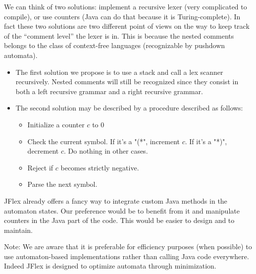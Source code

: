 \documentclass[12pt]{report}
\begin{document}
We can think of two solutions: implement a recursive lexer (very complicated to compile),
or use counters (Java can do that because it is Turing-complete).
In fact these two solutions are two different point of views on the way to keep track of the ``comment level'' the lexer
is in. This is because the nested comments belongs to the class of context-free languages (recognizable by pushdown
automata).
\begin{itemize}
  \item The first solution we propose is to use a stack and call a lex scanner recursively.
    Nested comments will still be recognized since they consist in both a left recursive grammar and a right recursive
    grammar.
  \item %
    The second solution may be described by a procedure described as follows:
    \begin{itemize}
      \item{Initialize a counter $c$ to 0}
      \item{Check the current symbol. If it's a "(*", increment $c$. If it's a "*)", decrement $c$. Do nothing in other cases.}
      \item{Reject if $c$ becomes strictly negative.}
      \item{Parse the next symbol.}
    \end{itemize}
\end{itemize}
JFlex already offers a fancy way to integrate custom Java methods in the automaton states. Our preference would be to
benefit from it and manipulate counters in the Java part of the code. This would be easier to design and to maintain.

Note: We are aware that it is preferable for efficiency purposes (when possible) to use automaton-based implementations
rather than calling Java code everywhere. Indeed JFlex is designed to optimize automata through minimization.  
\end{document}
